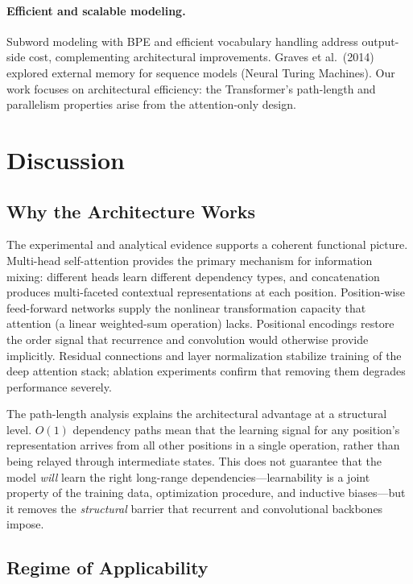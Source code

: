 ﻿\documentclass{article}
\begin{document}
\paragraph{Efficient and scalable modeling.}
Subword modeling with BPE \citep{sennrich2016rare} and efficient vocabulary handling \citep{jean2015large} address output-side cost, complementing architectural improvements. Graves et al.\ (2014) explored external memory for sequence models (Neural Turing Machines). Our work focuses on architectural efficiency: the Transformer's path-length and parallelism properties arise from the attention-only design.

\section{Discussion}

\subsection{Why the Architecture Works}

The experimental and analytical evidence supports a coherent functional picture. Multi-head self-attention provides the primary mechanism for information mixing: different heads learn different dependency types, and concatenation produces multi-faceted contextual representations at each position. Position-wise feed-forward networks supply the nonlinear transformation capacity that attention (a linear weighted-sum operation) lacks. Positional encodings restore the order signal that recurrence and convolution would otherwise provide implicitly. Residual connections and layer normalization stabilize training of the deep attention stack; ablation experiments confirm that removing them degrades performance severely.

The path-length analysis explains the architectural advantage at a structural level. $O(1)$ dependency paths mean that the learning signal for any position's representation arrives from all other positions in a single operation, rather than being relayed through intermediate states. This does not guarantee that the model \emph{will} learn the right long-range dependencies---learnability is a joint property of the training data, optimization procedure, and inductive biases---but it removes the \emph{structural} barrier that recurrent and convolutional backbones impose.

\subsection{Regime of Applicability}
\end{document}
